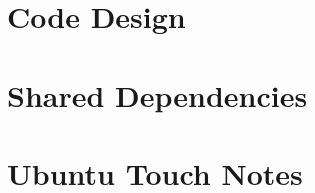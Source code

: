 \chapter{Code Design}






\chapter{Shared Dependencies}






\newpage



\chapter{Ubuntu Touch Notes}












%



